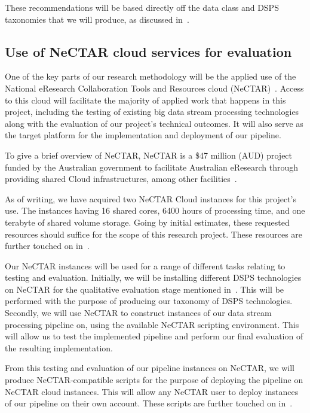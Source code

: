 \documentclass[a4paper,11pt]{article}
\begin{document}

These recommendations will be based directly off the data class and DSPS taxonomies that we will produce, as discussed
in~.


\subsection{Use of NeCTAR cloud services for evaluation} %
\label{sub:use_of_nectar_cloud_services}

One of the key parts of our research methodology will be the applied use of the National eResearch Collaboration Tools
and Resources cloud (NeCTAR)~\cite{web:Nectar}. Access to this cloud will facilitate the majority of applied work that
happens in this project, including the testing of existing big data stream processing technologies along with the
evaluation of our project's technical outcomes. It will also serve as the target platform for the implementation and
deployment of our pipeline.

To give a brief overview of NeCTAR, NeCTAR is a \$47 million (AUD) project funded by the Australian government to
facilitate Australian eResearch through providing shared Cloud infrastructures, among other
facilities~\cite{sinnott_towards_2011}.

As of writing, we have acquired two NeCTAR Cloud instances for this project's use. The instances having 16 shared
cores, 6400 hours of processing time, and one terabyte of shared volume storage. Going by initial estimates, these
requested resources should suffice for the scope of this research project. These resources are further touched on
in~.

Our NeCTAR instances will be used for a range of different tasks relating to testing and evaluation. Initially, we will
be installing different DSPS technologies on NeCTAR for the qualitative evaluation stage mentioned
in~. This will be performed with the purpose of producing our taxonomy of DSPS
technologies. Secondly, we will use NeCTAR to construct instances of our data stream processing pipeline on, using the
available NeCTAR scripting environment. This will allow us to test the implemented pipeline and perform our final
evaluation of the resulting implementation.

From this testing and evaluation of our pipeline instances on NeCTAR, we will produce NeCTAR-compatible scripts for the
purpose of deploying the pipeline on NeCTAR cloud instances. This will allow any NeCTAR user to deploy instances of our
pipeline on their own account. These scripts are further touched on in~.
\end{document}
